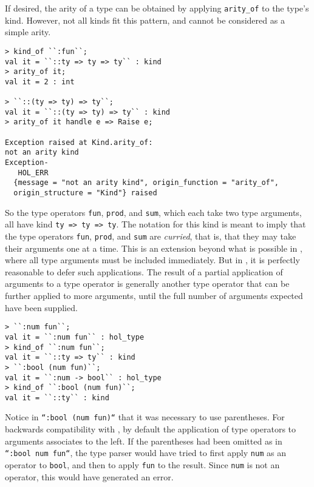 If desired, the \HOL{} arity of a type can be obtained by applying 
\texttt{arity\_of} to the type's kind. However, not all kinds
fit this pattern, and cannot be considered as a simple arity.
%
\begin{session}
\begin{verbatim}
> kind_of ``:fun``;
val it = ``::ty => ty => ty`` : kind
> arity_of it;
val it = 2 : int

> ``::(ty => ty) => ty``;
val it = ``::(ty => ty) => ty`` : kind
> arity_of it handle e => Raise e;

Exception raised at Kind.arity_of:
not an arity kind
Exception-
   HOL_ERR
  {message = "not an arity kind", origin_function = "arity_of",
  origin_structure = "Kind"} raised
\end{verbatim}
\end{session}

So the type operators \texttt{fun}, \texttt{prod}, and \texttt{sum},
which each take two type arguments, all have kind \texttt{ty => ty => ty}.
The notation for this kind is meant to imply that the type operators
\texttt{fun}, \texttt{prod}, and \texttt{sum}
are {\it curried}, that is, that they may take their arguments one at a time.
This is an extension beyond what is possible in \HOL, where all
type arguments must be included immediately. But in \HOLW{}, it is
perfectly reasonable to defer such applications. 
The result of a partial application of arguments to
a type operator is generally another type operator that can be further
applied to more arguments, until the full number of arguments
expected have been supplied.
%
\begin{session}
\begin{verbatim}
> ``:num fun``;
val it = ``:num fun`` : hol_type
> kind_of ``:num fun``;
val it = ``::ty => ty`` : kind
> ``:bool (num fun)``;
val it = ``:num -> bool`` : hol_type
> kind_of ``:bool (num fun)``;
val it = ``::ty`` : kind
\end{verbatim}
\end{session}

Notice in \texttt{``:bool (num fun)``} that it was necessary to use
parentheses.  For backwards compatibility with \HOL, by default
the application of type operators to arguments associates to the left.
If the parentheses had been omitted as in \texttt{``:bool num fun``},
the type parser would have tried to first apply \texttt{num} as an operator
to \texttt{bool}, and then to apply \texttt{fun} to the result.  Since
\texttt{num} is not an operator, this would have generated an error.

